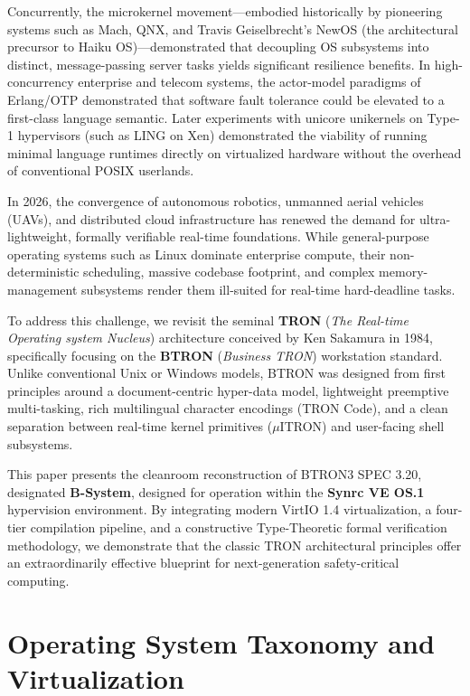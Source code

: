 \documentclass[10pt,journal,compsoc,twocolumn]{article}
\begin{document}
Concurrently, the microkernel movement---embodied historically by pioneering systems such as Mach, QNX, and Travis Geiselbrecht's NewOS (the architectural precursor to Haiku OS)---demonstrated that decoupling OS subsystems into distinct, message-passing server tasks yields significant resilience benefits. In high-concurrency enterprise and telecom systems, the actor-model paradigms of Erlang/OTP demonstrated that software fault tolerance could be elevated to a first-class language semantic. Later experiments with unicore unikernels on Type-1 hypervisors (such as LING on Xen) demonstrated the viability of running minimal language runtimes directly on virtualized hardware without the overhead of conventional POSIX userlands.

In 2026, the convergence of autonomous robotics, unmanned aerial vehicles (UAVs), and distributed cloud infrastructure has renewed the demand for ultra-lightweight, formally verifiable real-time foundations. While general-purpose operating systems such as Linux dominate enterprise compute, their non-deterministic scheduling, massive codebase footprint, and complex memory-management subsystems render them ill-suited for real-time hard-deadline tasks.

To address this challenge, we revisit the seminal \textbf{TRON} (\emph{The Real-time Operating system Nucleus}) architecture conceived by Ken Sakamura in 1984, specifically focusing on the \textbf{BTRON} (\emph{Business TRON}) workstation standard. Unlike conventional Unix or Windows models, BTRON was designed from first principles around a document-centric hyper-data model, lightweight preemptive multi-tasking, rich multilingual character encodings (TRON Code), and a clean separation between real-time kernel primitives ($\mu$ITRON) and user-facing shell subsystems.

This paper presents the cleanroom reconstruction of BTRON3 SPEC 3.20, designated \textbf{B-System}, designed for operation within the \textbf{Synrc VE OS.1} hypervision environment. By integrating modern VirtIO 1.4 virtualization, a four-tier compilation pipeline, and a constructive Type-Theoretic formal verification methodology, we demonstrate that the classic TRON architectural principles offer an extraordinarily effective blueprint for next-generation safety-critical computing.

\section{Operating System Taxonomy and Virtualization}
\label{sec:virtualization}
\end{document}
